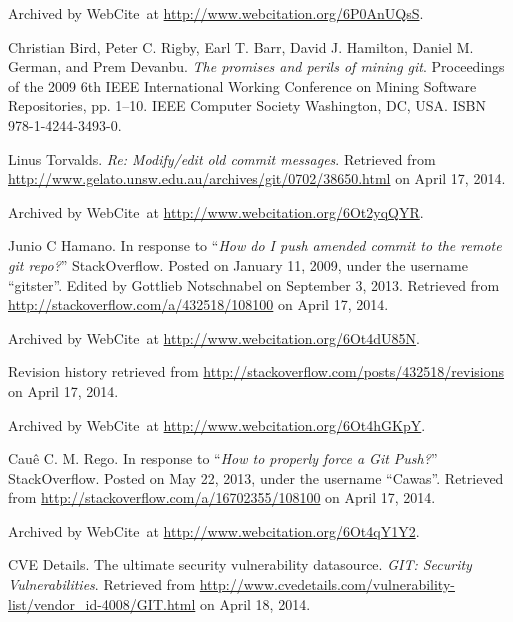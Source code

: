\begin{thebibliography}{9}
Archived by WebCite\textsuperscript{\textregistered}\ at
\url{http://www.webcitation.org/6P0AnUQsS}.


Christian Bird, Peter C. Rigby, Earl T. Barr, David J. Hamilton, Daniel M.
German, and Prem Devanbu. \emph{The promises and perils of mining git}.
Proceedings of the 2009 6th IEEE International Working Conference on Mining
Software Repositories, pp. 1--10. IEEE Computer Society Washington, DC, USA.
ISBN 978-1-4244-3493-0.


Linus Torvalds. \emph{Re: Modify/edit old commit messages}. Retrieved from
\url{http://www.gelato.unsw.edu.au/archives/git/0702/38650.html} on April 17,
2014.

Archived by WebCite\textsuperscript{\textregistered}\ at
\url{http://www.webcitation.org/6Ot2yqQYR}.


Junio C Hamano. In response to ``\emph{How do I push amended commit to the remote
git repo?}'' StackOverflow. Posted on January 11, 2009, under the username
``gitster''. Edited by Gottlieb Notschnabel on September 3, 2013. Retrieved
from \url{http://stackoverflow.com/a/432518/108100} on April 17, 2014.

Archived by WebCite\textsuperscript{\textregistered}\ at
\url{http://www.webcitation.org/6Ot4dU85N}.

Revision history retrieved from
\url{http://stackoverflow.com/posts/432518/revisions} on April 17, 2014.

Archived by WebCite\textsuperscript{\textregistered}\ at
\url{http://www.webcitation.org/6Ot4hGKpY}.


Cauê C. M. Rego. In response to ``\emph{How to properly force a Git Push?}''
StackOverflow. Posted on May 22, 2013, under the username ``Cawas''.  Retrieved
from \url{http://stackoverflow.com/a/16702355/108100} on April 17, 2014.

Archived by WebCite\textsuperscript{\textregistered}\ at
\url{http://www.webcitation.org/6Ot4qY1Y2}.


CVE Details. The ultimate security vulnerability datasource. \emph{GIT:
Security Vulnerabilities}. Retrieved from
\url{http://www.cvedetails.com/vulnerability-list/vendor_id-4008/GIT.html} on
April 18, 2014.


\end{thebibliography}
